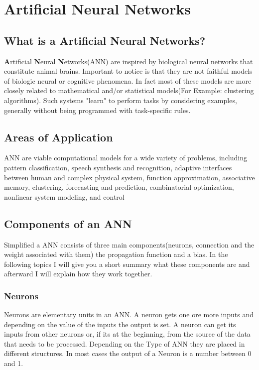 \chapter{Artificial Neural Networks\authorB}

\section{What is a Artificial Neural Networks?}

  \textbf{A}rtificial \textbf{N}eural \textbf{N}etworks(ANN) are inspired by biological neural networks that constitute animal brains. Important to notice is that they are not faithful models of biologic neural or cognitive phenomena. In fact most of these models are more closely related to mathematical and/or statistical models(For Example: clustering algorithms). Such systems "learn" to perform tasks by considering examples, generally without being programmed with task-specific rules. 
 
\section{Areas of Application}

 ANN are viable computational models for a wide variety of problems, including pattern classification, speech synthesis and recognition, adaptive interfaces between human and complex physical system, function approximation, associative memory, clustering, forecasting and prediction, combinatorial optimization, nonlinear system modeling, and control
 \cite{fundamentals_ann}
 
\section{Components of an ANN}

Simplified a ANN consists of three main components(neurons, connection and the weight associated with them) the propagation function and a bias. In the following topics I will give you a short summary what these components are and afterward I will explain how they work together. 

\subsection{Neurons}

Neurons are elementary units in an ANN. A neuron gets one ore more inputs and depending on the value of the inputs the output is set. A neuron can get its inputs from other neurons or, if its at the beginning, from the source of the data that needs to be processed. Depending on the Type of ANN they are placed in different structures. In most cases the output of a Neuron is a number between 0 and 1.

